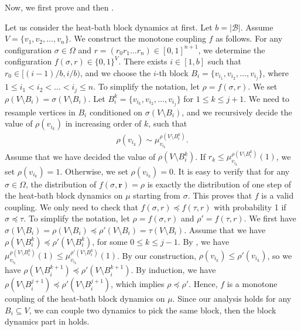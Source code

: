 \documentclass[11pt]{amsart}
\def\+#1{\mathcal{#1}}
\theoremstyle{definition}
\theoremstyle{remark}
\begin{document}
Now, we first prove  and then .


Let us consider the heat-bath block dynamics at first.
Let $b = |\+B|$. Assume $V=\{v_1,v_2,\ldots,v_n\}$. We construct the monotone coupling $f$ as follows. For any configuration $\sigma \in \Omega$ and $r=(r_0r_1\ldots r_n)\in [0,1]^{n+1}$, we determine the configuration $f(\sigma,r) \in \{0,1\}^V$.
There exists $i\in [1,b]$ such that $r_0\in [(i-1)/b,i/b)$, and we choose the $i$-th block $B_i=\{v_{i_1},v_{i_2},\ldots,v_{i_j}\}$, where $1\leq i_1<i_2<\ldots<i_j\leq n$. 
To simplify the notation, let $\rho = f(\sigma,r)$.
We set $\rho(V\setminus B_i)=\sigma(V\setminus B_i)$. Let $B_i^k={\{v_{i_k},v_{i_2},\ldots,v_{i_j}\}}$ for $1\leq k \leq j+1$. We need to resample vertices in $B_i$ conditioned on $\sigma(V\setminus B_i)$, and we recursively decide the value
of $\rho(v_{i_k})$ in increasing order of $k$, such that 
\begin{align}\label{eq:recursive-v_i}
    \rho(v_{i_k})\sim \mu_{v_{i_k}}^{\rho(V\setminus B_i^k)}.
\end{align}
Assume that we have decided the value of $\rho(V\setminus B_i^k)$.
If $r_k\leq \mu_{v_{i_k}}^{\rho(V\setminus B_i^k)}(1)$, we set $\rho(v_{i_k})=1$. Otherwise, we set $\rho(v_{i_k})=0$.
It is easy to verify that for any $\sigma \in \Omega$, the distribution of $f(\sigma,\boldsymbol{r}) = \rho$ is exactly the distribution of one step of the heat-bath block dynamics on $\mu$ starting from $\sigma$. This proves that $f$ is a valid coupling.
We only need to check that $f(\sigma,r)\preceq f(\tau,r)$ with probability 1 if $\sigma \preceq \tau$. 
To simplify the notation, let $\rho = f(\sigma,r)$ and $\rho' = f(\tau,r)$.
We first have $\sigma(V \setminus B_i) = \rho(V\setminus B_i)\preceq \rho'(V\setminus B_i) = \tau(V \setminus B_i)$. 
Assume that we have $\rho(V\setminus B_i^k)\preceq \rho'(V\setminus B_i^k)$, for some $0\leq k\leq j-1$. By , we have $\mu_{v_{i_k}}^{\rho(V\setminus B_i^k)}(1)\leq \mu_{v_{i_k}}^{\rho'(V\setminus B_i^k)}(1)$. 
By our construction, $\rho(v_{i_k})\leq \rho'(v_{i_k})$, so we have $\rho(V\setminus B_i^{k+1})\preceq \rho'(V\setminus B_i^{k+1})$. By induction, we have $\rho(V\setminus B_i^{j+1})\preceq \rho'(V\setminus B_i^{j+1})$, which implies $\rho\preceq \rho'$. Hence, $f$ is a monotone coupling of the heat-bath block dynamics on $\mu$. Since our analysis holds for any $B_i\subseteq V$, we can couple two dynamics to pick the same block, then the block dynamics part in  holds.
\end{document}
